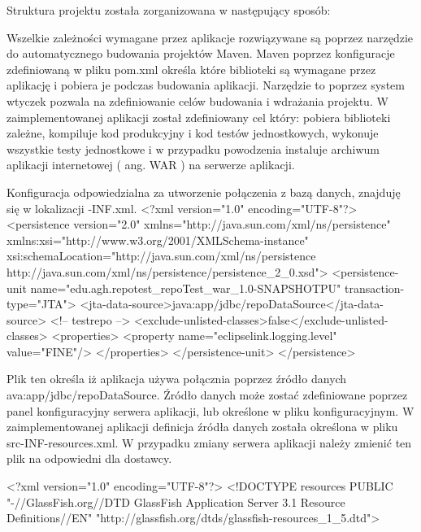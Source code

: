 Struktura projektu została zorganizowana w następujący sposób:


Wszelkie zależności wymagane przez aplikacje rozwiązywane są poprzez narzędzie do automatycznego budowania projektów Maven. Maven poprzez konfiguracje zdefiniowaną w pliku pom.xml określa które biblioteki są wymagane przez aplikację i pobiera je podczas budowania aplikacji. Narzędzie to poprzez system wtyczek pozwala na zdefiniowanie celów budowania i wdrażania projektu. W zaimplementowanej aplikacji został zdefiniowany cel który: pobiera biblioteki zależne, kompiluje kod produkcyjny i kod testów jednostkowych, wykonuje wszystkie testy jednostkowe i w przypadku powodzenia instaluje archiwum aplikacji internetowej ( ang. WAR ) na serwerze aplikacji.

Konfiguracja odpowiedzialna za utworzenie połączenia z bazą danych, znajduję się w lokalizacji \src\main\resources\META-INF\persistence.xml.
<?xml version="1.0" encoding="UTF-8"?>
<persistence version="2.0" xmlns="http://java.sun.com/xml/ns/persistence" xmlns:xsi="http://www.w3.org/2001/XMLSchema-instance" xsi:schemaLocation="http://java.sun.com/xml/ns/persistence http://java.sun.com/xml/ns/persistence/persistence_2_0.xsd">
    <persistence-unit name="edu.agh.repotest_repoTest_war_1.0-SNAPSHOTPU" transaction-type="JTA">
        <jta-data-source>java:app/jdbc/repoDataSource</jta-data-source> <!-- testrepo -->
        <exclude-unlisted-classes>false</exclude-unlisted-classes>
        <properties>
            <property name="eclipselink.logging.level" value="FINE"/>
        </properties>
    </persistence-unit>
</persistence>

Plik ten określa iż aplikacja używa połącznia poprzez źródło danych ava:app/jdbc/repoDataSource. Źródło danych może zostać zdefiniowane poprzez panel konfiguracyjny serwera aplikacji, lub określone w pliku konfiguracyjnym. W zaimplementowanej aplikacji definicja źródła danych została określona w pliku src\main\webapp\WEB-INF\glassfish-resources.xml. W przypadku zmiany serwera aplikacji należy zmienić ten plik na odpowiedni dla dostawcy.

<?xml version="1.0" encoding="UTF-8"?>
<!DOCTYPE resources PUBLIC "-//GlassFish.org//DTD GlassFish Application Server 3.1
  Resource Definitions//EN" "http://glassfish.org/dtds/glassfish-resources_1_5.dtd">


